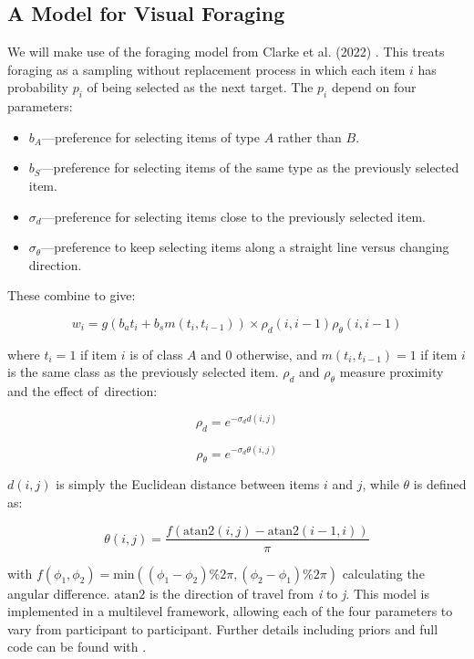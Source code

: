 \documentclass[vision,article,accept,pdftex,moreauthors]{Definitions/mdpi}
\begin{document}
\subsection{A Model for Visual Foraging}

We will make use of the foraging model from Clarke et al. (2022) \cite{clarke2022foraging}. This treats foraging as a sampling without replacement process in which each item $i$ has probability $p_i$ of being selected as the next target. The $p_i$ depend on four parameters:

\begin{itemize}
    \item $b_A$---preference for selecting items of type $A$ rather than $B$.
    \item $b_S$---preference for selecting items of the same type as the previously selected item.
    \item $\sigma_d$---preference for selecting items close to the previously selected item.
    \item $\sigma_{\theta}$---preference to keep selecting items along a straight line versus changing direction.
\end{itemize}

These combine to give:
\begin{linenomath}
\begin{equation}
    w_i = g\left(b_at_i + b_sm(t_i, t_{i-1})\right) \times \rho_d(i, i-1) \rho_{\theta}(i, i-1)
\end{equation}
\end{linenomath}
where $t_i = 1$ if item $i$ is of class $A$ and 0 otherwise, and  $m(t_i, t_{i-1}) =1$ if item $i$ is the same class as the previously selected item. $\rho_d$ and $\rho_{\theta}$ measure proximity and the effect of~direction:
\begin{linenomath}
\begin{equation}
    \rho_d = e^{-\sigma_dd(i,j)}
\end{equation}
\end{linenomath}
\begin{linenomath}
\begin{equation}
    \rho_{\theta} = e^{-\sigma_d\theta(i,j)}
\end{equation}
\end{linenomath}
$d(i,j)$ is simply the Euclidean distance between items $i$ and $j$, while $\theta$ is defined as:
\begin{linenomath}
\begin{equation}
    \theta(i,j) = \frac{f(\text{atan2}(i, j) - \text{atan2}(i-1, i))}{\pi}
\end{equation}
\end{linenomath}
with $f(\phi_1, \phi_2) = \text{min}((\phi_1 - \phi_2) \% 2\pi, (\phi_2 - \phi_1) \% 2\pi)$ calculating the angular difference. $\text{atan2}$ is the direction of travel from \textit{i} to \textit{j}.  This model is implemented in a multilevel framework, allowing each of the four parameters to vary from participant to participant. Further details including priors and full code can be found with \cite{clarke2022foraging}.
\end{document}
